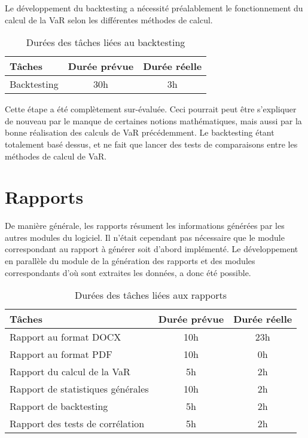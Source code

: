 \documentclass[a4paper]{report}
\begin{document}
Le développement du backtesting a nécessité préalablement le fonctionnement du calcul de la VaR selon les différentes méthodes de calcul.

\begin{table}[H]
\centering
  \begin{tabularx}{0.8\textwidth}{| X | c | c |}
    \hline
	Tâches & Durée prévue & Durée réelle \\
    \hline
    Backtesting &  30h & 3h\\
    \hline
  \end{tabularx}
  \caption{Durées des tâches liées au backtesting}
\end{table}

Cette étape a été complètement sur-évaluée.
Ceci pourrait peut être s'expliquer de nouveau par le manque de certaines notions mathématiques, mais aussi par la bonne réalisation des calculs de VaR précédemment.
Le backtesting étant totalement basé dessus, et ne fait que lancer des tests de comparaisons entre les méthodes de calcul de VaR.


\section{Rapports}

De manière générale, les rapports résument les informations générées par les autres modules du logiciel.
Il n'était cependant pas nécessaire que le module correspondant au rapport à générer soit d'abord implémenté.
Le développement en parallèle du module de la génération des rapports et des modules correspondants d'où sont extraites les données, a donc été possible.

\begin{table}[H]
\centering
  \begin{tabularx}{0.8\textwidth}{| X | c | c |}
    \hline
	Tâches & Durée prévue & Durée réelle \\
    \hline
    Rapport au format DOCX &  10h & 23h\\
    Rapport au format PDF &  10h & 0h\\
    Rapport du calcul de la VaR & 5h & 2h\\
    Rapport de statistiques générales & 10h & 2h\\
    Rapport de backtesting & 5h & 2h\\
    Rapport des tests de corrélation & 5h & 2h\\
    \hline
  \end{tabularx}
  \caption{Durées des tâches liées aux rapports}
\end{table}
\end{document}
